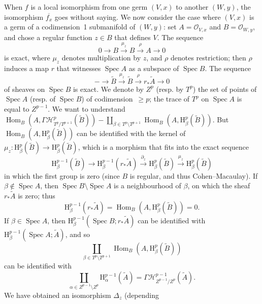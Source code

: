 \documentclass[british]{article}
\newcommand{\oldpage}[1]{\marginpar{\footnotesize$\Big\vert$ \textit{p.~#1}}}
\begin{document}
When \(f\) is a local isomorphism from one germ \((V,x)\) to another
\((W,y)\), the isomorphism \(\overline{f_x}\) goes without saying. We
now consider the case where \((V,x)\) is a germ of a codimension~1
submanifold of \((W,y)\): set \(A={\mathscr{O}}_{V,x}\) and
\(B={\mathscr{O}}_{W,y}\), and chose a regular function \(z\in B\) that
defines \(V\). The sequence \[
  0 \to B \xrightarrow{\mu_z} B \xrightarrow{\rho} A \to 0
\] is exact, where \(\mu_z\) denotes multiplication by \(z\), and
\(\rho\) denotes restriction; then \(\rho\) induces a map \(r\) that
witnesses \(\operatorname{Spec}{A}\) as a subspace of
\(\operatorname{Spec}{B}\). The sequence \[
  - \to \widetilde{B} \xrightarrow{\mu_z} \widetilde{B} \xrightarrow{\rho} r_*\widetilde{A} \to 0
\] of sheaves on \(\operatorname{Spec}{B}\) is exact. We denote by
\(Z^p\) (resp. by \(T^p\)) the set of points of
\(\operatorname{Spec}{A}\) (resp. of \(\operatorname{Spec}{B}\)) of
codimension~\(\geqslant p\); the trace of \(T^p\) on
\(\operatorname{Spec}{A}\) is equal to \(Z^{p-1}\). We want to
understand
\(\operatorname{Hom}_B(A,\Gamma{\mathscr{H}}_{T^p/T^{p+1}}^p(\widetilde{B}))-\coprod_{\beta\in T^p\setminus T^{p+1}}\operatorname{Hom}_B(A,\mathrm{H}_\beta^p(\widetilde{B}))\).
But \(\operatorname{Hom}_B(A,\mathrm{H}_\beta^p(\widetilde{B}))\) can be
identified with the kernel of
\(\mu_z\colon\mathrm{H}_\beta^p(\widetilde{B})\to\mathrm{H}_\beta^p(\widetilde{B})\),
which is a morphism that fits into the exact sequence \[
  \mathrm{H}_\beta^{p-1}(\widetilde{B})
  \to \mathrm{H}_\beta^{p-1}(r_*\widetilde{A})
  \xrightarrow{\partial_z} \mathrm{H}_\beta^p(\widetilde{B})
  \xrightarrow{\mu_z} \mathrm{H}_\beta^p(\widetilde{B})
\] in which the first group is zero (since \(B\) is regular, and thus
Cohen--Macaulay). If \(\beta\not\in\operatorname{Spec}{A}\), then
\(\operatorname{Spec}{B}\setminus\operatorname{Spec}{A}\) is a
neighbourhood of \(\beta\), on which the sheaf \(r_*\widetilde{A}\) is
zero; thus \[
  \mathrm{H}_\beta^{p-1}(r_*\widetilde{A})
  = \operatorname{Hom}_B(A,\mathrm{H}_\beta^p(\widetilde{B}))
  = 0.
\] If \(\beta\in\operatorname{Spec}{A}\), then
\(\mathrm{H}_\beta^{p-1}(\operatorname{Spec}{B};r_*\widetilde{A})\) can
be identified with
\(\mathrm{H}_\beta^{p-1}(\operatorname{Spec}{A};\widetilde{A})\), and so
\[
  \coprod_{\beta\in T^p\setminus T^{p+1}}\operatorname{Hom}_B(A,\mathrm{H}_\beta^p(\widetilde{B}))
\] can be identified with \[
  \coprod_{\alpha\in Z^{p-1}\setminus Z^p} \mathrm{H}_\alpha^{p-1}(\widetilde{A})
  = \Gamma{\mathscr{H}}_{Z^{p-1}/Z^p}^{p-1}(\widetilde{A}).
\] \oldpage{86} We have obtained an isomorphism \(\Delta_z\) (depending
\end{document}
